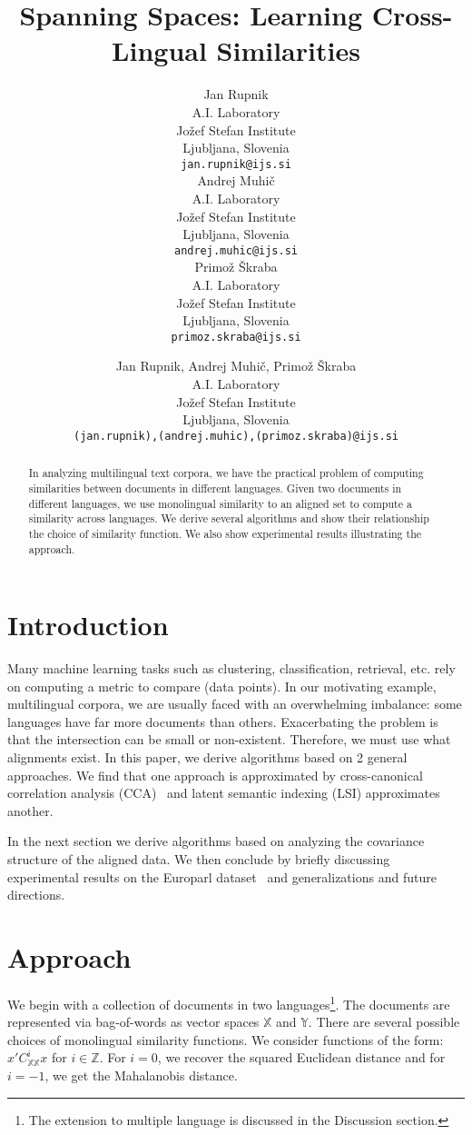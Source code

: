 \documentclass{article} %
\title{Spanning Spaces: Learning Cross-Lingual Similarities}
\author{
Jan Rupnik \\
A.I. Laboratory\\
Jo\v zef Stefan Institute\\
Ljubljana, Slovenia\\
\texttt{jan.rupnik@ijs.si} \\
\And
Andrej Muhi\v c\\
A.I. Laboratory\\
Jo\v zef Stefan Institute\\
Ljubljana, Slovenia\\
\texttt{andrej.muhic@ijs.si} \\
\AND
Primo\v z \v Skraba \\
A.I. Laboratory\\
Jo\v zef Stefan Institute\\
Ljubljana, Slovenia\\
\texttt{primoz.skraba@ijs.si} \\
}
\author{
Jan Rupnik, Andrej Muhi\v c, Primo\v z \v Skraba \\
A.I. Laboratory\\
Jo\v zef Stefan Institute\\
Ljubljana, Slovenia\\
\texttt{(jan.rupnik),(andrej.muhic),(primoz.skraba)@ijs.si} \\
}
\newcommand{\X}{\mathbb{X}}
\newcommand{\Y}{\mathbb{Y}}
\begin{document}
\maketitle

\begin{abstract}
In analyzing multilingual text corpora, we have the practical
problem of computing similarities between documents in different
languages. Given two documents in different languages, we use
monolingual similarity to an aligned set to compute a similarity
across languages. We derive several algorithms and show their
relationship the choice of similarity function. We also show
experimental results illustrating the approach.
\end{abstract}



\section{Introduction}
Many machine learning tasks such as clustering, classification,
retrieval, etc. rely on computing a metric to compare (data
points). In our motivating example, multilingual corpora, we are
usually faced with an overwhelming imbalance: some languages have
far more documents than others.  Exacerbating the problem is that
the intersection can be small or non-existent. Therefore, we must
use what alignments exist. In this paper, we derive algorithms
based on 2 general approaches. We find that one approach is
approximated by cross-canonical correlation analysis
(CCA)~\cite{Hotelling} and latent semantic indexing (LSI)\cite{lsi} approximates another.

In the next section we derive algorithms based on analyzing the
covariance structure of the aligned data.  We then conclude by
briefly discussing experimental results on the Europarl
dataset~\cite{europarl} and generalizations and future
directions.

\section{Approach}

We begin with a collection of documents in two
languages\footnote{The extension to multiple language is
 discussed in the Discussion section.}. The documents are
represented via bag-of-words as vector spaces $\X$ and
$\Y$. There are several possible choices of monolingual
similarity functions. We consider functions of the form:
$x'C_{\X\X}^i x$ for $i\in \mathbb{Z}$. For $i=0$, we recover the
squared Euclidean distance and for $i=-1$, we get the Mahalanobis
distance.
\end{document}
